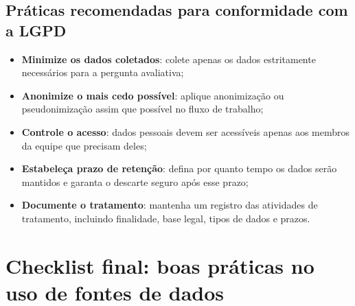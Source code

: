 \subsection{Práticas recomendadas para conformidade com a LGPD}

\begin{itemize}
  \item \textbf{Minimize os dados coletados}: colete apenas os dados estritamente necessários para a pergunta avaliativa;
  \item \textbf{Anonimize o mais cedo possível}: aplique anonimização ou pseudonimização assim que possível no fluxo de trabalho;
  \item \textbf{Controle o acesso}: dados pessoais devem ser acessíveis apenas aos membros da equipe que precisam deles;
  \item \textbf{Estabeleça prazo de retenção}: defina por quanto tempo os dados serão mantidos e garanta o descarte seguro após esse prazo;
  \item \textbf{Documente o tratamento}: mantenha um registro das atividades de tratamento, incluindo finalidade, base legal, tipos de dados e prazos.
\end{itemize}

\section{Checklist final: boas práticas no uso de fontes de dados}


